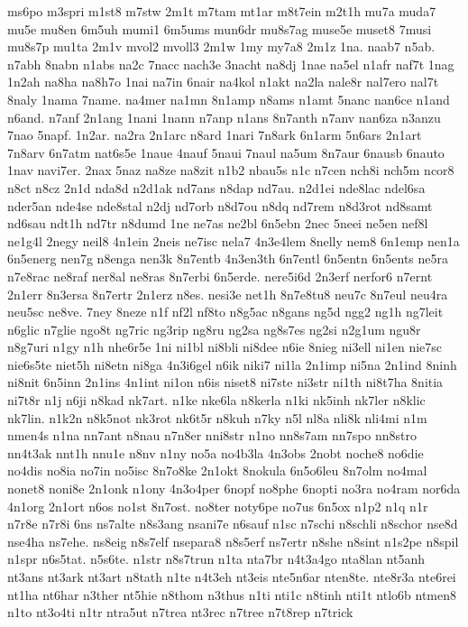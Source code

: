 {ms6po
m3spri
m1st8
m7stw
2m1t
m7tam
mt1ar
m8t7ein
m2t1h
mu7a
muda7
mu5e
mu8en
6m5uh
mumi1
6m5ums
mun6dr
mu8s7ag
muse5e
muset8
7musi
mu8s7p
mu1ta
2m1v
mvol2
mvoll3
2m1w
1my
my7a8
2m1z
1na.
naab7
n5ab.
n7abh
8nabn
n1abs
na2c
7nacc
nach3e
3nacht
na8dj
1nae
na5el
n1afr
naf7t
1nag
1n2ah
na8ha
na8h7o
1nai
na7in
6nair
na4kol
n1akt
na2la
nale8r
nal7ero
nal7t
8naly
1nama
7name.
na4mer
na1mn
8n1amp
n8ams
n1amt
5nanc
nan6ce
n1and
n6and.
n7anf
2n1ang
1nani
1nann
n7anp
n1ans
8n7anth
n7anv
nan6za
n3anzu
7nao
5napf.
1n2ar.
na2ra
2n1arc
n8ard
1nari
7n8ark
6n1arm
5n6ars
2n1art
7n8arv
6n7atm
nat6s5e
1naue
4nauf
5naui
7naul
na5um
8n7aur
6nausb
6nauto
1nav
navi7er.
2nax
5naz
na8ze
na8zit
n1b2
nbau5s
n1c
n7cen
nch8i
nch5m
ncor8
n8ct
n8cz
2n1d
nda8d
n2d1ak
nd7ans
n8dap
nd7au.
n2d1ei
nde8lac
ndel6sa
nder5an
nde4se
nde8stal
n2dj
nd7orb
n8d7ou
n8dq
nd7rem
n8d3rot
nd8samt
nd6sau
ndt1h
nd7tr
n8dumd
1ne
ne7as
ne2bl
6n5ebn
2nec
5neei
ne5en
nef8l
ne1g4l
2negy
neil8
4n1ein
2neis
ne7isc
nela7
4n3e4lem
8nelly
nem8
6n1emp
nen1a
6n5energ
nen7g
n8enga
nen3k
8n7entb
4n3en3th
6n7entl
6n5entn
6n5ents
ne5ra
n7e8rac
ne8raf
ner8al
ne8ras
8n7erbi
6n5erde.
nere5i6d
2n3erf
nerfor6
n7ernt
2n1err
8n3ersa
8n7ertr
2n1erz
n8es.
nesi3e
net1h
8n7e8tu8
neu7c
8n7eul
neu4ra
neu5sc
ne8ve.
7ney
8neze
n1f
nf2l
nf8to
n8g5ac
n8gans
ng5d
ngg2
ng1h
ng7leit
n6glic
n7glie
ngo8t
ng7ric
ng3rip
ng8ru
ng2sa
ng8s7es
ng2si
n2g1um
ngu8r
n8g7uri
n1gy
n1h
nhe6r5e
1ni
ni1bl
ni8bli
ni8dee
n6ie
8nieg
ni3ell
ni1en
nie7sc
nie6s5te
niet5h
ni8etn
ni8ga
4n3i6gel
n6ik
niki7
ni1la
2n1imp
ni5na
2n1ind
8ninh
ni8nit
6n5inn
2n1ins
4n1int
ni1on
n6is
niset8
ni7ste
ni3str
ni1th
ni8t7ha
8nitia
ni7t8r
n1j
n6ji
n8kad
nk7art.
n1ke
nke6la
n8kerla
n1ki
nk5inh
nk7ler
n8klic
nk7lin.
n1k2n
n8k5not
nk3rot
nk6t5r
n8kuh
n7ky
n5l
nl8a
nli8k
nli4mi
n1m
nmen4s
n1na
nn7ant
n8nau
n7n8er
nni8str
n1no
nn8s7am
nn7spo
nn8stro
nn4t3ak
nnt1h
nnu1e
n8nv
n1ny
no5a
no4b3la
4n3obs
2nobt
noche8
no6die
no4dis
no8ia
no7in
no5isc
8n7o8ke
2n1okt
8nokula
6n5o6leu
8n7olm
no4mal
nonet8
noni8e
2n1onk
n1ony
4n3o4per
6nopf
no8phe
6nopti
no3ra
no4ram
nor6da
4n1org
2n1ort
n6os
no1st
8n7ost.
no8ter
noty6pe
no7us
6n5ox
n1p2
n1q
n1r
n7r8e
n7r8i
6ns
ns7alte
n8s3ang
nsani7e
n6sauf
n1sc
n7schi
n8schli
n8schor
nse8d
nse4ha
ns7ehe.
ns8eig
n8s7elf
nsepara8
n8s5erf
ns7ertr
n8she
n8sint
n1s2pe
n8spil
n1spr
n6s5tat.
n5s6te.
n1str
n8s7trun
n1ta
nta7br
n4t3a4go
nta8lan
nt5anh
nt3ans
nt3ark
nt3art
n8tath
n1te
n4t3eh
nt3eis
nte5n6ar
nten8te.
nte8r3a
nte6rei
nt1ha
nt6har
n3ther
nt5hie
n8thom
n3thus
n1ti
nti1c
n8tinh
nti1t
ntlo6b
ntmen8
n1to
nt3o4ti
n1tr
ntra5ut
n7trea
nt3rec
n7tree
n7t8rep
n7trick
}
